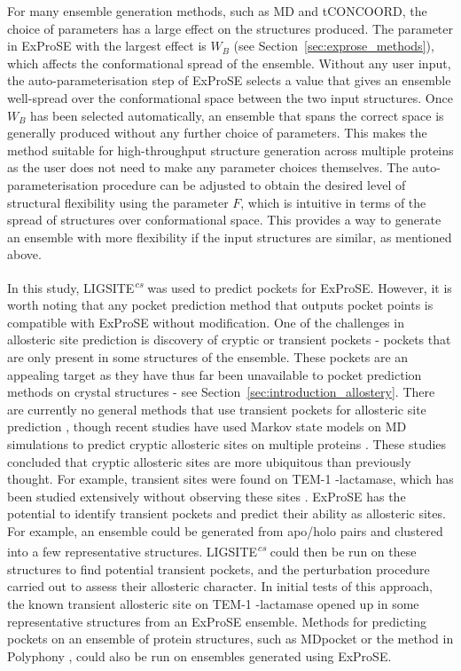 For many ensemble generation methods, such as MD and tCONCOORD, the choice of parameters has a large effect on the structures produced.
The parameter in ExProSE with the largest effect is $W_{B}$ (see Section~\ref{sec:exprose_methods}), which affects the conformational spread of the ensemble.
Without any user input, the auto-parameterisation step of ExProSE selects a value that gives an ensemble well-spread over the conformational space between the two input structures.
Once $W_{B}$ has been selected automatically, an ensemble that spans the correct space is generally produced without any further choice of parameters.
This makes the method suitable for high-throughput structure generation across multiple proteins as the user does not need to make any parameter choices themselves.
The auto-parameterisation procedure can be adjusted to obtain the desired level of structural flexibility using the parameter $F$, which is intuitive in terms of the spread of structures over conformational space.
This provides a way to generate an ensemble with more flexibility if the input structures are similar, as mentioned above.

In this study, LIGSITE\textsuperscript{\it cs} was used to predict pockets for ExProSE.
However, it is worth noting that any pocket prediction method that outputs pocket points is compatible with ExProSE without modification.
One of the challenges in allosteric site prediction is discovery of cryptic or transient pockets - pockets that are only present in some structures of the ensemble.
These pockets are an appealing target as they have thus far been unavailable to pocket prediction methods on crystal structures - see Section~\ref{sec:introduction_allostery}.
There are currently no general methods that use transient pockets for allosteric site prediction \cite{Boehr2009}, though recent studies have used Markov state models on MD simulations to predict cryptic allosteric sites on multiple proteins \cite{Bowman2012, Bowman2015}.
These studies concluded that cryptic allosteric sites are more ubiquitous than previously thought.
For example, transient sites were found on TEM-1 \textbeta -lactamase, which has been studied extensively without observing these sites \cite{Bowman2015}.
ExProSE has the potential to identify transient pockets and predict their ability as allosteric sites.
For example, an ensemble could be generated from apo/holo pairs and clustered into a few representative structures.
LIGSITE\textsuperscript{\it cs} could then be run on these structures to find potential transient pockets, and the perturbation procedure carried out to assess their allosteric character.
In initial tests of this approach, the known transient allosteric site on TEM-1 \textbeta -lactamase opened up in some representative structures from an ExProSE ensemble.
Methods for predicting pockets on an ensemble of protein structures, such as MDpocket \cite{Schmidtke2011} or the method in Polyphony \cite{Pitt2014}, could also be run on ensembles generated using ExProSE.

